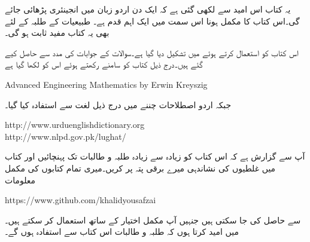 یہ کتاب اس امید سے لکھی گئی ہے کہ ایک دن اردو زبان میں انجینئری پڑھائی جائے گی۔اس کتاب کا مکمل ہونا اس سمت میں ایک اہم قدم ہے۔ طبیعیات کے طلبہ کے لئے بھی یہ کتاب مفید ثابت ہو گی۔

اس کتاب کو  استعمال کرتے ہوئے  میں تشکیل دیا گیا ہے۔سوالات کے جوابات  کی مدد سے حاصل کیے گئے ہیں۔درج ذیل کتاب کو سامنے رکھتے ہوئے  اس کو لکھا گیا ہے

{
\begin{otherlanguage}{english}
Advanced Engineering Mathematics by Erwin Kreyszig
\end{otherlanguage}
}

جبکہ اردو اصطلاحات چننے میں درج ذیل لغت سے استفادہ  کیا گیا۔

{
\begin{otherlanguage}{english}
http:/\!\!/www.urduenglishdictionary.org\\
http:/\!\!/www.nlpd.gov.pk/lughat/
\end{otherlanguage}
}

آپ سے گزارش ہے کہ اس کتاب کو زیادہ سے زیادہ طلبہ و طالبات تک پہنچائیں اور کتاب میں غلطیوں کی نشاندہی میرے  برقی پتہ پر کریں۔میری تمام کتابوں کی مکمل  معلومات

{
\begin{otherlanguage}{english}
https:/\!\!/www.github.com/khalidyousafzai
\end{otherlanguage}
}

سے حاصل کی جا سکتی ہیں جنہیں آپ مکمل اختیار کے ساتھ استعمال کر سکتے ہیں۔میں امید کرتا ہوں کہ طلبہ و طالبات اس کتاب سے استفادہ ہوں گے۔
\vspace{5mm}

{}


